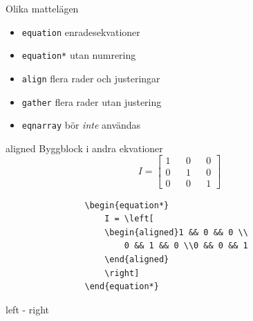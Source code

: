 \documentclass[xcolor=x11names,compress,swedish]{beamer}
\newcommand*{\Lcode}{\lstinline[{language=[LaTeX]TeX}]}
\begin{document}
		\begin{frame}{Olika mattelägen}
			\begin{itemize}
				\item \texttt{equation} enradesekvationer
				\item \texttt{equation*} utan numrering
				\item \texttt{align} flera rader och justeringar
				\item \texttt{gather} flera rader utan justering
				\item \texttt{eqnarray} bör \emph{inte} användas
			\end{itemize}
		\end{frame}
		
		\begin{frame}[fragile]{aligned}
			Byggblock i andra ekvationer
			\begin{equation*}
				I = \left[
				\begin{aligned}
					1 && 0 && 0 \\ 0 && 1 && 0 \\
					0 && 0 && 1
				\end{aligned}
				\right]
			\end{equation*}
			\begin{lstlisting}
				\begin{equation*}
					I = \left[
					\begin{aligned}1 && 0 && 0 \\
						0 && 1 && 0 \\0 && 0 && 1
					\end{aligned}
					\right]
				\end{equation*}
			\end{lstlisting}
		\end{frame}
		
		\begin{frame}[fragile]{left - right}
		\end{frame}
\end{document}

